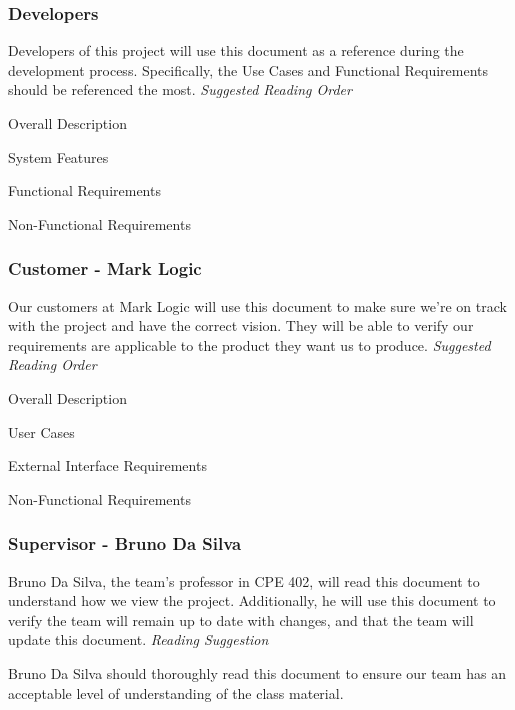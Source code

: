 \documentclass[12pt,oneside,letterpaper]{article}
\newenvironment{packed_enumerate}{ %
\vspace{-7mm}
\begin{enumerate}
  \setlength{\itemsep}{0pt}
  \setlength{\parskip}{0pt}
  \setlength{\parsep}{0pt}
}{\end{enumerate}
\vspace{-8mm}}
\begin{document}
\subsubsection{Developers}
Developers of this project will use this document as a reference during the development process. Specifically, the Use Cases and Functional Requirements should be referenced the most.\newline
\textit{Suggested Reading Order}\newline
\begin{packed_enumerate}
\item Overall Description
\item System Features
\item Functional Requirements
\item Non-Functional Requirements\newline
\end{packed_enumerate}

\subsubsection{Customer - Mark Logic}
Our customers at Mark Logic will use this document to make sure we're on track with the project and have the correct vision. They will be able to verify our requirements are applicable to the product they want us to produce.\newline
\textit{Suggested Reading Order}\newline
\begin{packed_enumerate}
\item Overall Description
\item User Cases
\item External Interface Requirements
\item Non-Functional Requirements\newline
\end{packed_enumerate}

\subsubsection{Supervisor - Bruno Da Silva}
Bruno Da Silva, the team's professor in CPE 402, will read this document to understand how we view the project. Additionally, he will use this document to verify the team will remain up to date with changes, and that the team will update this document.\newline
\textit{Reading Suggestion}\newline
\par Bruno Da Silva should thoroughly read this document to ensure our team has an acceptable level of understanding of the class material.
\end{document}
